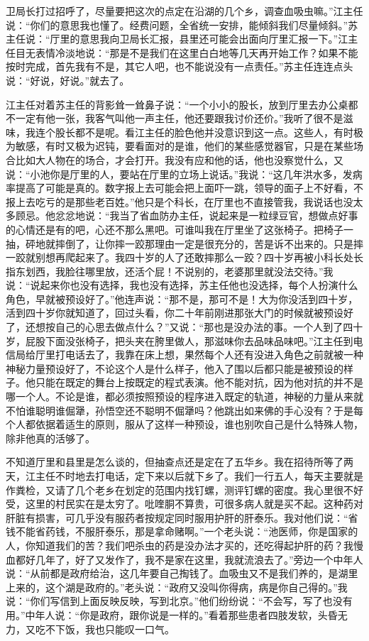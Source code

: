 \documentclass[12pt,oneside]{book}
\begin{document}
卫局长打过招呼了，尽量要把这次的点定在沿湖的几个乡，调查血吸虫嘛。''江主任说：``你们的意思我也懂了。经费问题，全省统一安排，能倾斜我们尽量倾斜。''苏主任说：``厅里的意思我向卫局长汇报，县里还可能会出面向厅里汇报一下。''江主任目无表情冷淡地说：``那是不是我们在这里白白地等几天再开始工作？如果不能按时完成，首先我有不是，其它人吧，也不能说没有一点责任。''苏主任连连点头说：``好说，好说。''就去了。

江主任对着苏主任的背影耸一耸鼻子说：``一个小小的股长，放到厅里去办公桌都不一定有他一张，我客气叫他一声主任，他还要跟我讨价还价。''我听了很不是滋味，我连个股长都不是呢。看江主任的脸色他并没意识到这一点。这些人，有时极为敏感，有时又极为迟钝，要看面对的是谁，他们的某些感觉器官，只是在某些场合比如大人物在的场合，才会打开。我没有应和他的话，他也没察觉什么，又说：``小池你是厅里的人，要站在厅里的立场上说话。''我说：``这几年洪水多，发病率提高了可能是真的。数字报上去可能会把上面吓一跳，领导的面子上不好看，不报上去吃亏的是那些老百姓。''他只是个科长，在厅里也不直接管我，我说话也没太多顾忌。他忿忿地说：``我当了省血防办主任，说起来是一粒绿豆官，想做点好事的心情还是有的吧，心还不那么黑吧。可谁叫我在厅里坐了这张椅子。把椅子一抽，砰地就摔倒了，让你摔一跤那理由一定是很充分的，苦是诉不出来的。只是摔一跤就别想再爬起来了。我四十岁的人了还敢摔那么一跤？四十岁再被小科长处长指东划西，我脸往哪里放，还活个屁！不说别的，老婆那里就没法交待。''我说：``说起来你也没有选择，我也没有选择，苏主任他也没选择，每个人扮演什么角色，早就被预设好了。''他连声说：``那不是，那可不是！大为你没活到四十岁，活到四十岁你就知道了，回过头看，你二十年前刚进那张大门的时候就被预设好了，还想按自己的心思去做点什么？''又说：``那也是没办法的事。一个人到了四十岁，屁股下面没张椅子，把头夹在胯里做人，那滋味你去品味品味吧。''江主任到电信局给厅里打电话去了，我靠在床上想，果然每个人还有没进入角色之前就被一种神秘力量预设好了，不论这个人是什么样子，他入了围以后都只能是被预设的样子。他只能在既定的舞台上按既定的程式表演。他不能对抗，因为他对抗的并不是哪一个人。不论是谁，都必须按照预设的程序进入既定的轨道，神秘的力量从来就不怕谁聪明谁倔犟，孙悟空还不聪明不倔犟吗？他跳出如来佛的手心没有？于是每个人都依据着适生的原则，服从了这样一种预设，谁也别吹自己是什么特殊人物，除非他真的活够了。

不知道厅里和县里是怎么谈的，但抽查点还是定在了五华乡。我在招待所等了两天，江主任不时地去打电话，定下来以后就下乡了。我们一行五人，每天主要就是作粪检，又请了几个老乡在划定的范围内找钉螺，测评钉螺的密度。我心里很不好受，这里的村民实在是太穷了。吡喹胴不算贵，可很多病人就是买不起。这种药对肝脏有损害，可几乎没有服药者按规定同时服用护肝的肝泰乐。我对他们说：``省钱不能省药钱，不服肝泰乐，那是拿命赌啊。''一个老头说：``池医师，你是国家的人，你知道我们的苦？我们吧杀虫的药是没办法才买的，还吃得起护肝的药？我慢血都好几年了，好了又发作了，我不是家在这里，我就流浪去了。''旁边一个中年人说：``从前都是政府给治，这几年要自己掏钱了。血吸虫又不是我们养的，是湖里上来的，这个湖是政府的。''老头说：``政府又没叫你得病，病是你自己得的。''我说：``你们写信到上面反映反映，写到北京。''他们纷纷说：``不会写，写了也没有用。''中年人说：``你是政府，跟你说是一样的。''看着那些患者四肢发软，头昏无力，又吃不下饭，我也只能叹一口气。
\end{document}
